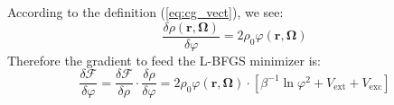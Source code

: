 According to the definition (\ref{eq:cg_vect}), we see:
\begin{equation}
\frac{\delta\rho(\mathbf{r},\mathbf{\Omega})}{\delta\varphi}=2\rho_{0}\varphi(\mathbf{r},\mathbf{\Omega})
\end{equation}
Therefore the gradient to feed the L-BFGS minimizer is:
\begin{equation}
\frac{\delta\mathcal{F}}{\delta\varphi}=\frac{\delta\mathcal{F}}{\delta\rho}\cdot\frac{\delta\rho}{\delta\varphi}=2\rho_{0}\varphi(\mathbf{r},\mathbf{\Omega})\cdot\left[\beta^{-1}\ln\varphi^{2}+V_{\mathrm{ext}}+V_{\mathrm{exc}}\right]
\end{equation}

